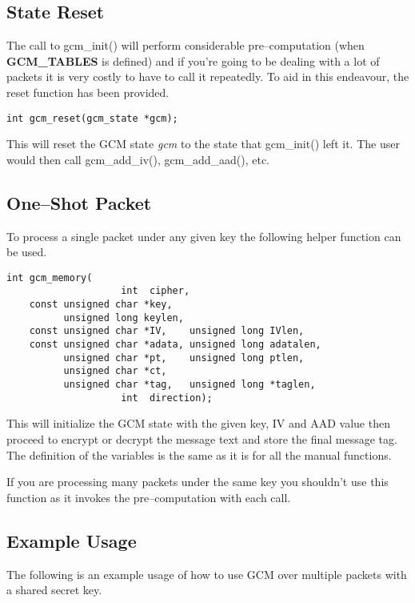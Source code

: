 \documentclass[synpaper]{book}
\begin{document}
\subsection{State Reset}
The call to gcm\_init() will perform considerable pre--computation (when \textbf{GCM\_TABLES} is defined) and if you're going to be dealing with a lot of packets
it is very costly to have to call it repeatedly.  To aid in this endeavour, the reset function has been provided.

\begin{verbatim}
int gcm_reset(gcm_state *gcm);
\end{verbatim}

This will reset the GCM state \textit{gcm} to the state that gcm\_init() left it.  The user would then call gcm\_add\_iv(), gcm\_add\_aad(), etc.

\subsection{One--Shot Packet}
To process a single packet under any given key the following helper function can be used.

\begin{verbatim}
int gcm_memory(
                    int  cipher,
    const unsigned char *key,
          unsigned long keylen,
    const unsigned char *IV,    unsigned long IVlen,
    const unsigned char *adata, unsigned long adatalen,
          unsigned char *pt,    unsigned long ptlen,
          unsigned char *ct,
          unsigned char *tag,   unsigned long *taglen,
                    int  direction);
\end{verbatim}

This will initialize the GCM state with the given key, IV and AAD value then proceed to encrypt or decrypt the message text and store the final
message tag.  The definition of the variables is the same as it is for all the manual functions.

If you are processing many packets under the same key you shouldn't use this function as it invokes the pre--computation with each call.

\subsection{Example Usage}
The following is an example usage of how to use GCM over multiple packets with a shared secret key.
\end{document}
